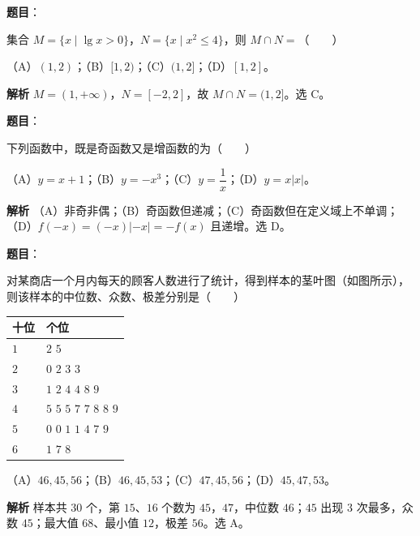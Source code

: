 
\begin{answer}

\textbf{题目}：

集合 $M=\{x\mid\lg x>0\}$，$N=\{x\mid x^2\leqslant4\}$，则 $M\cap N=$\mbox{（　　）}

（A）$(1,2)$；（B）$[1,2)$；（C）$(1,2]$；（D）$[1,2]$。

\textbf{解析}
$M=(1,+\infty)$，$N=[-2,2]$，故 $M\cap N=(1,2]$。选 C。


\end{answer}
\begin{answer}

\textbf{题目}：

下列函数中，既是奇函数又是增函数的为\mbox{（　　）}

（A）$y=x+1$；（B）$y=-x^3$；（C）$y=\dfrac1x$；（D）$y=x|x|$。

\textbf{解析}
（A）非奇非偶；（B）奇函数但递减；（C）奇函数但在定义域上不单调；（D）$f(-x)=(-x)|-x|=-f(x)$ 且递增。选 D。


\end{answer}
\begin{answer}

\textbf{题目}：

对某商店一个月内每天的顾客人数进行了统计，得到样本的茎叶图（如图所示），则该样本的中位数、众数、极差分别是\mbox{（　　）}

\begin{center}
\begin{tabular}{ll}
\toprule
十位 & 个位 \\
\midrule
$1$ & $2$ $5$ \\
$2$ & $0$ $2$ $3$ $3$ \\
$3$ & $1$ $2$ $4$ $4$ $8$ $9$ \\
$4$ & $5$ $5$ $5$ $7$ $7$ $8$ $8$ $9$ \\
$5$ & $0$ $0$ $1$ $1$ $4$ $7$ $9$ \\
$6$ & $1$ $7$ $8$ \\
\bottomrule
\end{tabular}
\end{center}

（A）$46,45,56$；（B）$46,45,53$；（C）$47,45,56$；（D）$45,47,53$。

\textbf{解析}
样本共 $30$ 个，第 $15$、$16$ 个数为 $45$，$47$，中位数 $46$；$45$ 出现 $3$ 次最多，众数 $45$；最大值 $68$、最小值 $12$，极差 $56$。选 A。


\end{answer}
